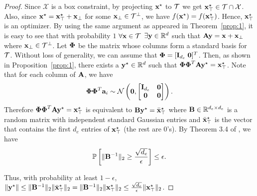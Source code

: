 \documentclass{article}
\begin{document}
\begin{proof}
Since $\mathcal{X}$ is a box constraint, by projecting $\mathbf{x}^\star$ to $\cal T$ we get $\mathbf{x}^\star_\top \in \mathcal{T} \cap \mathcal{X}$. Also, since $\mathbf{x}^\star =  \mathbf{x}^\star_\top + \mathbf{x}_\bot$ for some $\mathbf{x}_\bot \in \cal T^{\bot}$, we have $f(\mathbf{x}^\star) = f(\mathbf{x}^\star_\top)$. Hence, $\mathbf{x}^\star_\top$ is an optimizer.
By using the same argument as appeared in Theorem~\ref{prop:1}, it is easy to see that with probability $1$ $\forall \mathbf{x} \in \cal T$ $\exists \mathbf{y} \in \mathbb{R}^d$ such that $\mathbf{A}\mathbf{y} = \mathbf{x} + \mathbf{x}_\bot$ where $\mathbf{x}_\bot \in \cal T^{\bot}$. Let $\boldsymbol{\Phi}$ be the matrix whose columns form a standard basis for $\cal T$. Without loss of generality, we can assume that 
$\boldsymbol{\Phi} = [\mathbf{I}_{d_e} \; \mathbf{0} ]^T$.
Then, as shown in Proposition~\ref{prop:1}, there exists a $\mathbf{y}^\star \in \mathbb{R}^d$ such that $\boldsymbol{\Phi} \boldsymbol{\Phi}^{T}\mathbf{A} \mathbf{y}^\star = \mathbf{x}^\star_\top$. Note that for each column of $\mathbf{A}$, we have
\[ \boldsymbol{\Phi} \boldsymbol{\Phi}^{T}\mathbf{a}_i \sim \mathcal{N}\left(\mathbf{0}, \begin{bmatrix}
\mathbf{I}_{d_e} & {\bf 0}\\
{\bf 0} & {\bf 0}\end{bmatrix}\right). \]
Therefore $\boldsymbol{\Phi} \boldsymbol{\Phi}^{T}\mathbf{A}\mathbf{y}^\star = \mathbf{x}^\star_\top$ is equivalent to $\mathbf{B}\mathbf{y}^\star = \bar{\mathbf{x}}^\star_\top$ where $\mathbf{B}\in \mathbb{R}^{d_e \times d_e}$ is a random matrix with independent standard Gaussian entries and $\bar{\mathbf{x}}^\star_\top$ is the vector that contains the first $d_e$ entries of $\mathbf{x}^\star_\top$ (the rest are $0$'s). By Theorem 3.4 of \cite{Sankar:2003}, we have
\[ \mathbb{P}\left[\|\mathbf{B}^{-1}\|_2 \geq \frac{\sqrt{d_e}}{\epsilon}\right]  \leq \epsilon. \]

Thus, with probability at least $1-\epsilon$, $\|\mathbf{y}^\star\| \leq \|\mathbf{B}^{-1}\|_2  \|\bar{\mathbf{x}}^\star_\top\|_2 = \|\mathbf{B}^{-1}\|_2  \|\mathbf{x}^\star_\top\|_2 \leq \frac{\sqrt{d_e}}{\epsilon} \|\mathbf{x}^\star_\top\|_2$. 
\end{proof}
\end{document}
